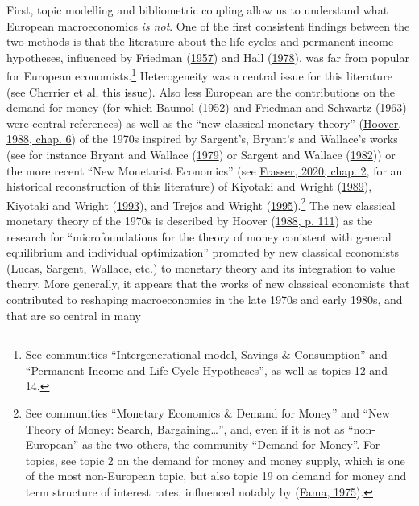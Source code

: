 \documentclass[]{elsarticle} %
\begin{document}
First, topic modelling and bibliometric coupling allow us to understand
what European macroeconomics \emph{is not}. One of the first consistent
findings between the two methods is that the literature about the life
cycles and permanent income hypotheses, influenced by Friedman
(\protect\hyperlink{ref-friedman1957}{1957}) and Hall
(\protect\hyperlink{ref-hall1978b}{1978}), was far from popular for
European economists.\footnote{See communities ``Intergenerational model,
  Savings \& Consumption'' and ``Permanent Income and Life-Cycle
  Hypotheses'', as well as topics 12 and 14.} Heterogeneity was a
central issue for this literature (see Cherrier et al, this issue). Also
less European are the contributions on the demand for money (for which
Baumol (\protect\hyperlink{ref-baumol1952}{1952}) and Friedman and
Schwartz (\protect\hyperlink{ref-friedman1963}{1963}) were central
references) as well as the ``new classical monetary theory''
(\protect\hyperlink{ref-hoover1988}{Hoover, 1988, chap. 6}) of the 1970s
inspired by Sargent's, Bryant's and Wallace's works (see for instance
Bryant and Wallace (\protect\hyperlink{ref-bryant1979}{1979}) or Sargent
and Wallace (\protect\hyperlink{ref-sargent1982}{1982})) or the more
recent ``New Monetarist Economics'' (see
\protect\hyperlink{ref-frasser2020}{Frasser, 2020, chap. 2}, for an
historical reconstruction of this literature) of Kiyotaki and Wright
(\protect\hyperlink{ref-kiyotaki1989}{1989}), Kiyotaki and Wright
(\protect\hyperlink{ref-kiyotaki1993}{1993}), and Trejos and Wright
(\protect\hyperlink{ref-trejos1995}{1995}).\footnote{See communities
  ``Monetary Economics \& Demand for Money'' and ``New Theory of Money:
  Search, Bargaining\ldots{}'', and, even if it is not as
  ``non-European'' as the two others, the community ``Demand for
  Money''. For topics, see topic 2 on the demand for money and money
  supply, which is one of the most non-European topic, but also topic 19
  on demand for money and term structure of interest rates, influenced
  notably by (\protect\hyperlink{ref-fama1975}{Fama, 1975}).} The new
classical monetary theory of the 1970s is described by Hoover
(\protect\hyperlink{ref-hoover1988}{1988, p. 111}) as the research for
``microfoundations for the theory of money conistent with general
equilibrium and individual optimization'' promoted by new classical
economists (Lucas, Sargent, Wallace, etc.) to monetary theory and its
integration to value theory. More generally, it appears that the works
of new classical economists that contributed to reshaping macroeconomics
in the late 1970s and early 1980s, and that are so central in many
\end{document}
